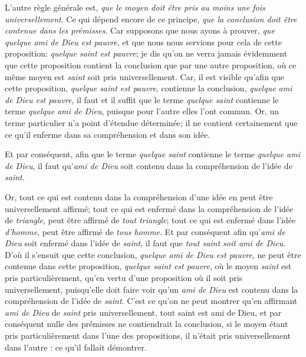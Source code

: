 L'autre règle générale est, \emph{que le moyen doit être pris au moins une fois universellement}. Ce qui dépend encore de ce principe, \emph{que la conclusion doit être contenue dans les prémisses}. Car supposons que nous ayons à prouver, \emph{que quelque ami de Dieu est pauvre}, et que nous nous servions pour cela de cette proposition: \emph{quelque saint est pauvre}; je dis qu'on ne verra jamais évidemment que cette proposition contient la conclusion que par une autre proposition, où ce même moyen est \emph{saint} soit pris universellement. Car, il est visible qu'afin que cette proposition, \emph{quelque saint est pauvre}, contienne la conclusion, \emph{quelque ami de Dieu est pauvre}, il faut et il suffit que le terme \emph{quelque saint} contienne le terme \emph{quelque ami de Dieu}, puisque pour l'autre elles l'ont commun. Or, un terme particulier n'a point d'étendue déterminée; il ne contient certainement que ce qu'il enferme dans sa compréhension et dans son idée.

Et par conséquent, afin que le terme \emph{quelque saint} contienne le terme \emph{quelque ami de Dieu}, il faut qu'\emph{ami de Dieu} soit contenu dans la compréhension de l'idée de \emph{saint}.

Or, tout ce qui est contenu dans la compréhension d'une idée en peut être universellement affirmé; tout ce qui est enfermé dans la compréhension de l'idée de \emph{triangle}, peut être affirmé de \emph{tout triangle}; tout ce qui est enfermé dans l'idée \emph{d'homme}, peut être affirmé de \emph{tous homme}. Et par conséquent afin qu'\emph{ami de Dieu} soit enfermé dans l'idée de \emph{saint}, il faut que \emph{tout saint soit ami de Dieu}. D'où il s'ensuit que cette conclusion, \emph{quelque ami de Dieu est pauvre}, ne peut être contenue dans cette proposition, \emph{quelque saint est pauvre}, où le moyen \emph{saint} est pris particulièrement, qu'en vertu d'une proposition où il soit pris universellement, puisqu'elle doit faire voir qu'un \emph{ami de Dieu} est contenu dans la compréhension de l'idée de \emph{saint}. C'est ce qu'on ne peut montrer qu'en affirmant \emph{ami de Dieu} de \emph{saint} pris universellement, tout saint est ami de Dieu, et par conséquent nulle des prémisses ne contiendrait la conclusion, si le moyen étant pris particulièrement dans l'une des propositions, il n'était pris universellement dans l'autre : ce qu'il fallait démontrer.


